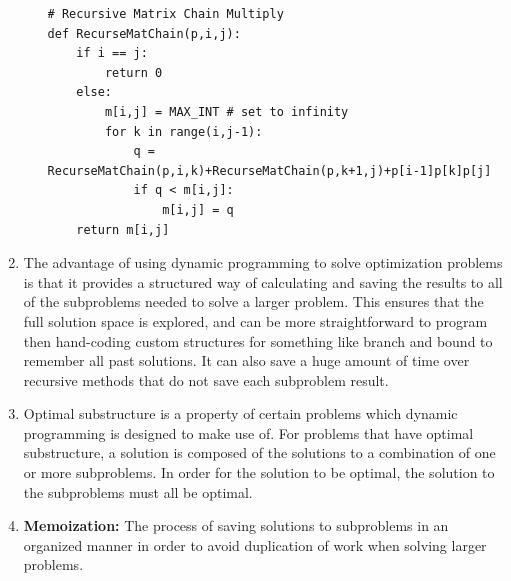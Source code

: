 \documentclass[12pt, letter]{article}
\begin{document}
\begin{enumerate}
\begin{enumerate}
\begin{verbatim}
# Recursive Matrix Chain Multiply
def RecurseMatChain(p,i,j):
    if i == j:
        return 0
    else:
        m[i,j] = MAX_INT # set to infinity
        for k in range(i,j-1):
            q = RecurseMatChain(p,i,k)+RecurseMatChain(p,k+1,j)+p[i-1]p[k]p[j]
            if q < m[i,j]:
                m[i,j] = q
    return m[i,j]
\end{verbatim}

	\end{enumerate}
	\item The advantage of using dynamic programming to solve optimization problems is that it provides a structured way of calculating and saving the results to all of the subproblems needed to solve a larger problem. This ensures that the full solution space is explored, and can be more straightforward to program then hand-coding custom structures for something like branch and bound to remember all past solutions. It can also save a huge amount of time over recursive methods that do not save each subproblem result.
	\item Optimal substructure is a property of certain problems which dynamic programming is designed to make use of. For problems that have optimal substructure, a solution is composed of the solutions to a combination of one or more subproblems. In order for the solution to be optimal, the solution to the subproblems must all be optimal.
	\item \textbf{Memoization:} The process of saving solutions to subproblems in an organized manner in order to avoid duplication of work when solving larger problems.
\end{enumerate}
\end{document}
